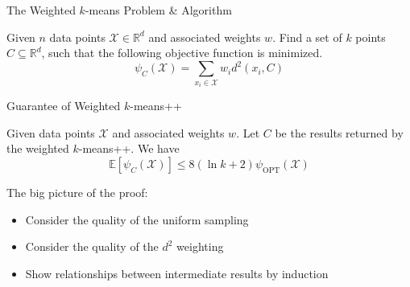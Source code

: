 \documentclass{beamer}
\newcommand{\R}{\mathbb{R}}
\newcommand{\E}{\mathbb{E}}
\begin{document}
\begin{frame}{The Weighted $k$-means Problem \& Algorithm}
	\begin{definition}
		\footnotesize
		Given $n$ data points $\mathcal{X} \in \R^d$ and associated weights $w$. Find a set of $k$ points $C \subseteq \R^d$, such that the following objective function is minimized.
		\begin{equation}
		\psi_C(\mathcal{X})=\sum_{x_i \in \mathcal{X}}w_i d^2(x_i,C)
		\end{equation}
	\end{definition}
	\vspace*{-0.5cm}
	\begin{center}
	\end{center}
	
\end{frame}

\begin{frame}{Guarantee of Weighted $k$-means++}
	\begin{theorem}
		Given data points $\mathcal{X}$ and associated weights $w$. Let $C$ be the results returned by the weighted $k$-means++. We have
		\begin{equation}
			\E[\psi_C(\mathcal{X})] \leq 8(\ln k + 2) \psi_\text{OPT}(\mathcal{X})
		\end{equation}
	\end{theorem}
	The big picture of the proof:
	\begin{itemize}
		\item Consider the quality of the uniform sampling
		\item Consider the quality of the $d^2$ weighting
		\item Show relationships between intermediate results by induction
	\end{itemize}
\end{frame}
\end{document}
